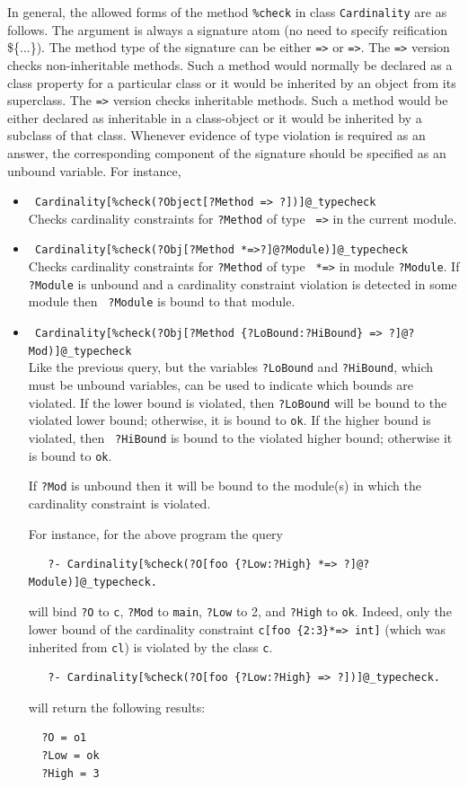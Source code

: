 \documentclass[11pt]{article}
\begin{document}
In general, the allowed forms of the method {\tt \%check} in class
{\tt Cardinality}  are as
follows.  The argument is always a signature atom (no need to specify
reification \$\{...\}).  The method type of the signature can be either
{\tt =>} or {\tt *=>}. The {\tt =>} version checks non-inheritable
methods. Such a method would normally be declared as a class property for a
particular class or it would be inherited by an object from its
superclass. The {\tt *=>} version checks inheritable methods. Such a method
would be either declared as inheritable in a class-object or it would be
inherited by a subclass of that class.  Whenever evidence of type
violation is required as an answer, the corresponding component of the
signature should be specified as an unbound variable. For instance,
\begin{itemize}
\item
  {\tt
    Cardinality[\%check(?Object[?Method => ?])]@\_typecheck}
  \\ 
  Checks cardinality constraints for {\tt ?Method} of type {\tt
    =>} in the current module.
\item
  {\tt
    Cardinality[\%check(?Obj[?Method *=>?]@?Module)]@\_typecheck}\\ 
  Checks cardinality constraints for {\tt ?Method} of type {\tt
    *=>} in module {\tt ?Module}. If {\tt ?Module} is unbound and a
  cardinality constraint violation is detected in some module then {\tt
    ?Module} is bound to that module.  
\item {\tt
    Cardinality[\%check(?Obj[?Method \{?LoBound:?HiBound\} => ?]@?Mod)]@\_typecheck}\\
  Like the previous query, but the variables {\tt ?LoBound} and
  {\tt ?HiBound}, which must be unbound variables, can be used to
  indicate which bounds are violated.  If the lower bound is violated, then
  {\tt ?LoBound} will be bound to the violated lower bound; otherwise, it
  is bound to {\tt ok}.  If the higher bound is violated, then {\tt
    ?HiBound} is bound to the violated higher bound; otherwise it is
  bound to {\tt ok}. 

  If {\tt ?Mod} is unbound then it will be bound to the module(s) in which
  the cardinality constraint is violated.

  For instance, for the above program the query
\begin{verbatim}
   ?- Cardinality[%check(?O[foo {?Low:?High} *=> ?]@?Module)]@_typecheck.  
\end{verbatim}
  will bind {\tt ?O} to {\tt c}, {\tt ?Mod} to {\tt main}, {\tt ?Low} to 2,
  and {\tt ?High} to {\tt ok}. Indeed, only the lower bound of the
  cardinality constraint {\tt c[foo \{2:3\}*=> int]} (which was inherited from
  {\tt cl}) is violated by the class {\tt c}.
\begin{verbatim}
   ?- Cardinality[%check(?O[foo {?Low:?High} => ?])]@_typecheck.
\end{verbatim}
  will return the following results:
\begin{verbatim}
  ?O = o1
  ?Low = ok
  ?High = 3


\end{verbatim}
\end{itemize}
\end{document}
